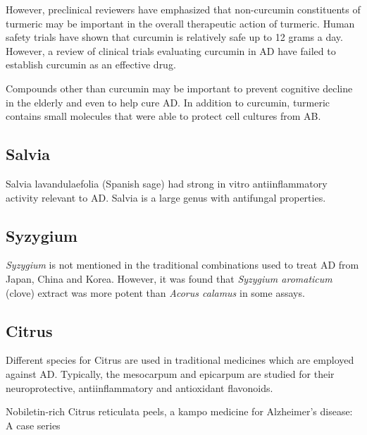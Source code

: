 \documentclass[twocolumn]{article}
\begin{document}

However, preclinical reviewers have emphasized that non-curcumin
constituents of turmeric may be important in the overall therapeutic
action of turmeric.
\cite{ahmed2014therapeutic}
Human safety trials have shown that curcumin is relatively safe
up to 12 grams a day.
However, a review of clinical trials evaluating curcumin
in AD have failed to establish curcumin as an effective drug.
\cite{hamaguchi2010review}

Compounds other than curcumin may be important to
prevent cognitive decline in the elderly
and even to help cure AD.
In addition to curcumin, turmeric contains small molecules
that were able to protect cell cultures from AB.
\cite{park2002discovery}



\subsection{Salvia}

Salvia lavandulaefolia (Spanish sage)
had strong in vitro antiinflammatory activity relevant to AD.
\cite{perry2001vitro}
Salvia is a large genus with antifungal properties.
\cite{yuce2014essential, tabanca2006chemical}



\subsection{Syzygium}

\textit{Syzygium} is not mentioned in the traditional combinations
used to treat AD
from Japan, China and Korea.
However, it was found that \textit{Syzygium aromaticum} (clove)
extract was more potent than \textit{Acorus calamus}
in some assays.
\cite{ขจร2001fungistatic}




\subsection{Citrus}

Different species for Citrus are used in traditional medicines
which are employed against AD.
Typically, the mesocarpum and epicarpum
are studied for their neuroprotective, antiinflammatory and antioxidant
flavonoids.
\cite{?}

Nobiletin-rich Citrus reticulata peels,
a kampo medicine for Alzheimer's disease: A case series
\cite{seki2013nobiletin}
\end{document}
